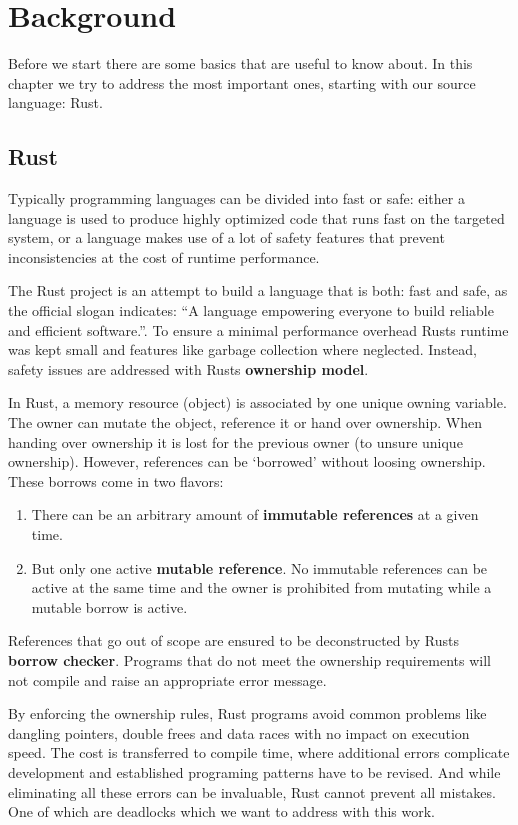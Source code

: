 \chapter{Background}
Before we start there are some basics that are useful to know about.
In this chapter we try to address the most important ones, starting with our source language: Rust.
\section{Rust}
\label{rel_rust}
Typically programming languages can be divided into fast or safe: 
either a language is used to produce highly optimized code that runs fast on the targeted system,
or a language makes use of a lot of safety features that prevent inconsistencies at the cost of runtime performance.

The Rust project is an attempt to build a language that is both: fast and safe, 
as the official slogan indicates: ``A language empowering everyone
to build reliable and efficient software.''\cite{rustSite}.
To ensure a minimal performance overhead Rusts runtime was kept small\cite[Chapter 16.1]{klabnik2018rust} and features like garbage collection where neglected\cite[Chapter 4]{klabnik2018rust}.
Instead, safety issues are addressed with Rusts \textbf{ownership model}\cite{Matsakis:2014:RL:2692956.2663188}.

In Rust, a memory resource (object) is associated by one unique owning variable.
The owner can mutate the object, reference it or hand over ownership.
When handing over ownership it is lost for the previous owner (to unsure unique ownership).
However, references can be `borrowed' without loosing ownership.
These borrows come in two flavors:
\begin{enumerate}
  \item There can be an arbitrary amount of \textbf{immutable references} at a given time.
  \item But only one active \textbf{mutable reference}. 
  No immutable references can be active at the same time and the owner is prohibited from mutating while a mutable borrow is active.
\end{enumerate}
References that go out of scope are ensured to be deconstructed by Rusts \textbf{borrow checker}. 
Programs that do not meet the ownership requirements will not compile and raise an appropriate error message.

By enforcing the ownership rules, Rust programs avoid common problems like dangling pointers, double frees and data races\cite{Matsakis:2014:RL:2692956.2663188} with no impact on execution speed.
The cost is transferred to compile time, where additional errors complicate development and established programing patterns have to be revised.
And while eliminating all these errors can be invaluable, Rust cannot prevent all mistakes.
One of which are deadlocks\cite[Chapter 8.1]{nomicon} which we want to address with this work.


